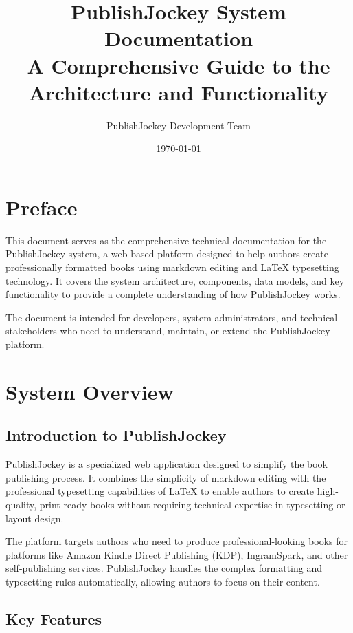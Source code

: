 \documentclass[12pt,a4paper]{book}
\title{\Huge \textbf{PublishJockey System Documentation}\\[0.5cm]
\Large A Comprehensive Guide to the Architecture and Functionality}
\author{PublishJockey Development Team}
\date{\today}
\begin{document}
\frontmatter
\maketitle

\tableofcontents

\chapter*{Preface}

This document serves as the comprehensive technical documentation for the PublishJockey system, a web-based platform designed to help authors create professionally formatted books using markdown editing and LaTeX typesetting technology. It covers the system architecture, components, data models, and key functionality to provide a complete understanding of how PublishJockey works.

The document is intended for developers, system administrators, and technical stakeholders who need to understand, maintain, or extend the PublishJockey platform.

\mainmatter

\chapter{System Overview}

\section{Introduction to PublishJockey}

PublishJockey is a specialized web application designed to simplify the book publishing process. It combines the simplicity of markdown editing with the professional typesetting capabilities of LaTeX to enable authors to create high-quality, print-ready books without requiring technical expertise in typesetting or layout design.

The platform targets authors who need to produce professional-looking books for platforms like Amazon Kindle Direct Publishing (KDP), IngramSpark, and other self-publishing services. PublishJockey handles the complex formatting and typesetting rules automatically, allowing authors to focus on their content.

\section{Key Features}
\end{document}
